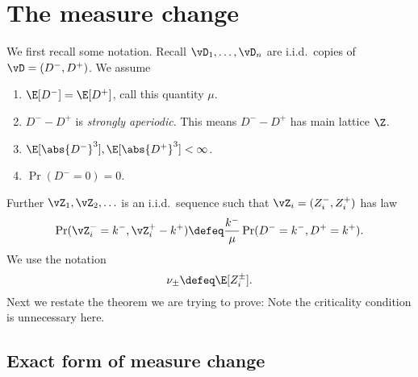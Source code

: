 \chapter{The measure change}
\label{chap:measure-change}

We first recall some notation. Recall $\vD_1, \ldots, \vD_n$ are i.i.d.\ copies of $\vD = (D^-, D^+)$. We assume
\begin{enumerate}
    \item $\E[D^-] = \E[D^+]$, call this quantity $\mu$.
    \item $D^- - D^+$ is \emph{strongly aperiodic}. This means $D^- - D^+$ has main lattice $\Z$.
    \item $\E[\abs{D^-}^3], \E[\abs{D^+}^3] < \infty$.
    \item $\Pr(D^- = 0) = 0$.
\end{enumerate}
Further $\vZ_1, \vZ_2, \ldots$ is an i.i.d.\ sequence such that $\vZ_i = (Z_i^-, Z_i^+)$ has law
\begin{equation*}
    \Pr(\vZ_i^- = k^-, \vZ_i^+ - k^+) \defeq \frac{k^-}{\mu} \Pr(D^- = k^-, D^+ = k^+).
\end{equation*}
We use the notation
\begin{equation*}
    \nu_{\pm} \defeq \E[Z_i^{\pm}].
\end{equation*}
Next we restate the theorem we are trying to prove:
\measurechange*
Note the criticality condition is unnecessary here.

\section{Exact form of measure change}

